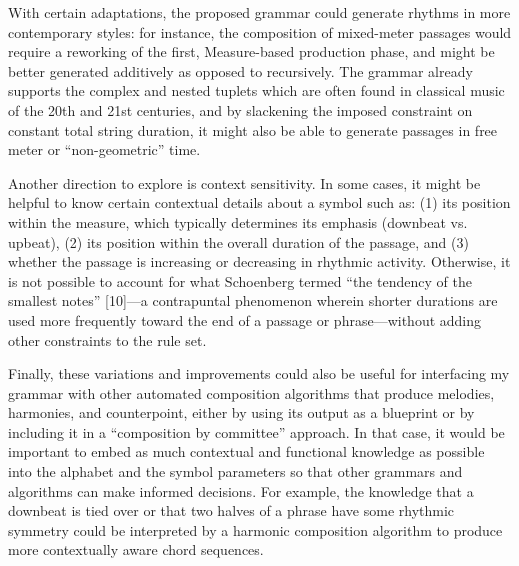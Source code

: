 \documentclass{article}
\begin{document}
With certain adaptations, the proposed grammar could generate rhythms in more contemporary styles: for instance, the composition of mixed-meter passages would require a reworking of the first, Measure-based production phase, and might be better generated additively as opposed to recursively. The grammar already supports the complex and nested tuplets which are often found in classical music of the 20th and 21st centuries, and by slackening the imposed constraint on constant total string duration, it might also be able to generate passages in free meter or “non-geometric” time.

Another direction to explore is context sensitivity. In some cases, it might be helpful to know certain contextual details about a symbol such as: (1) its position within the measure, which typically determines its emphasis (downbeat vs. upbeat), (2) its position within the overall duration of the passage, and (3) whether the passage is increasing or decreasing in rhythmic activity. Otherwise, it is not possible to account for what Schoenberg termed “the tendency of the smallest notes” [10]—a contrapuntal phenomenon wherein shorter durations are used more frequently toward the end of a passage or phrase—without adding other constraints to the rule set.

Finally, these variations and improvements could also be useful for interfacing my grammar with other automated composition algorithms that produce melodies, harmonies, and counterpoint, either by using its output as a blueprint or by including it in a “composition by committee” approach. In that case, it would be important to embed as much contextual and functional knowledge as possible into the alphabet and the symbol parameters so that other grammars and algorithms can make informed decisions. For example, the knowledge that a downbeat is tied over or that two halves of a phrase have some rhythmic symmetry could be interpreted by a harmonic composition algorithm to produce more contextually aware chord sequences.



\end{document}
